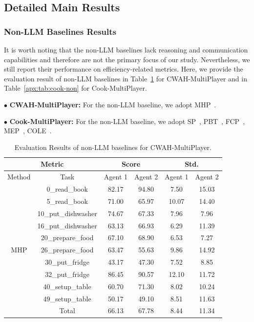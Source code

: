 \documentclass{article}
\theoremstyle{plain}
\theoremstyle{definition}
\theoremstyle{remark}
\begin{document}
\subsection{Detailed Main Results}\label{appx:main}

\subsubsection{Non-LLM Baselines Results}\label{apx:non}
It is worth noting that the non-LLM baselines lack reasoning and communication capabilities and therefore are not the primary focus of our study. Nevertheless, we still report their performance on efficiency-related metrics. Here, we provide the evaluation result of non-LLM baselines in Table~\ref{apx:tab:cwah-non} for CWAH-MultiPlayer and in Table~\ref{apx:tab:cook-non} for Cook-MultiPlayer.

$\bullet$ \textbf{CWAH-MultiPlayer:} For the non-LLM baseline, we adopt MHP~\cite{Korf87}.

$\bullet$ \textbf{Cook-MultiPlayer:}  For the non-LLM baseline, we adopt SP~\cite{Tesauro94,CarrollSHGSAD19}, PBT~\cite{jaderberg2017population}, FCP~\cite{StrouseMBHE21}, MEP~\cite{StrouseMBHE21}, COLE~\cite{0116ZS00W023,LiZSZDWWP24}.


\begin{table}[htbp]
  \centering
  \caption{Evaluation Results of non-LLM baselines for CWAH-MultiPlayer.}
    \begin{tabular}{c|c|cccc}
    \toprule
    \multicolumn{2}{c|}{Metric} & \multicolumn{2}{c}{Score} & \multicolumn{2}{c}{Std.} \\
    \midrule
    Method & Task  & Agent 1 & Agent 2 & Agent 1 & Agent 2 \\
    \midrule
    \multirow{11}[2]{*}{MHP} & 0\_read\_book & 82.17  & 94.80  & 7.50  & 15.03  \\
          & 5\_read\_book & 71.00  & 65.97  & 10.07  & 14.40  \\
          & 10\_put\_dishwasher & 74.67  & 67.33  & 7.96  & 7.96  \\
          & 16\_put\_dishwasher & 63.13  & 66.93  & 6.29  & 11.39  \\
          & 20\_prepare\_food & 67.10  & 68.90  & 6.53  & 7.27  \\
          & 26\_prepare\_food & 63.47  & 55.63  & 9.86  & 14.92  \\
          & 30\_put\_fridge & 43.17  & 47.30  & 7.52  & 8.85  \\
          & 32\_put\_fridge & 86.45  & 90.57  & 12.10  & 11.72  \\
          & 40\_setup\_table & 60.70  & 71.30  & 8.02  & 10.24  \\
          & 49\_setup\_table & 50.17  & 49.10  & 8.51  & 11.63  \\
          & Total & 66.13  & 67.78  & 8.44  & 11.34  \\
    \bottomrule
    \end{tabular}%
  \label{apx:tab:cwah-non}%
\end{table}%
\end{document}
